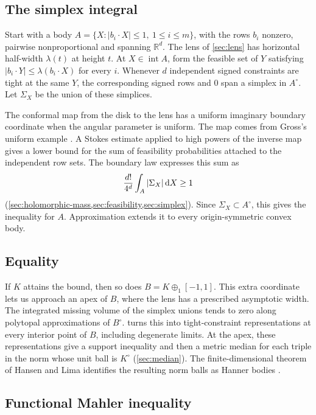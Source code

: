 \subsection{The simplex integral}

Start with a body $A=\{X:|b_i\cdot X|\leq1,\ 1\leq i\leq m\}$, with the rows $b_i$ nonzero, pairwise nonproportional and spanning $\mathbb{R}^d$. The lens of \cref{sec:lens} has horizontal half-width $\lambda(t)$ at height $t$. At $X\in\operatorname{int}A$, form the feasible set of $Y$ satisfying $|b_i\cdot Y|\leq\lambda(b_i\cdot X)$ for every $i$. Whenever $d$ independent signed constraints are tight at the same $Y$, the corresponding signed rows and $0$ span a simplex in $A^\circ$. Let $\Sigma_X$ be the union of these simplices.

The conformal map from the disk to the lens has a uniform imaginary boundary coordinate when the angular parameter is uniform. The map comes from Gross's uniform example \cite[Section~3.2]{Gross}. A Stokes estimate applied to high powers of the inverse map gives a lower bound for the sum of feasibility probabilities attached to the independent row sets. The boundary law expresses this sum as
\[
 \frac{d!}{4^d}\int_A |\Sigma_X|\,\mathrm{d} X\geq1
\]
(\cref{sec:holomorphic-mass,sec:feasibility,sec:simplex}). Since $\Sigma_X\subset A^\circ$, this gives the inequality for $A$. Approximation extends it to every origin-symmetric convex body.

\subsection{Equality}

If $K$ attains the bound, then so does $B=K\oplus_1[-1,1]$. This extra coordinate lets us approach an apex of $B$, where the lens has a prescribed asymptotic width. The integrated missing volume of the simplex unions tends to zero along polytopal approximations of $B^\circ$.  turns this into tight-constraint representations at every interior point of $B$, including degenerate limits. At the apex, these representations give a support inequality and then a metric median for each triple in the norm whose unit ball is $K^\circ$ (\cref{sec:median}). The finite-dimensional theorem of Hansen and Lima identifies the resulting norm balls as Hanner bodies \cite[Corollary~7.4]{HansenLima1981}.

\subsection{Functional Mahler inequality}\label{subsec:sec-functional-mahler}

